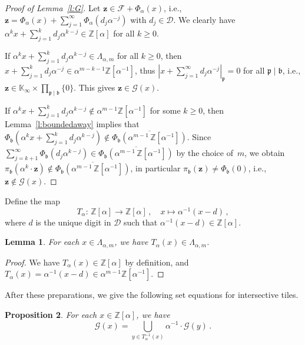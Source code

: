 \documentclass[12pt]{amsart}
\newtheorem{lemma}{Lemma}[section]
\newtheorem{proposition}[lemma]{Proposition}
\theoremstyle{definition}
\theoremstyle{remark}
\numberwithin{equation}{section}
\begin{document}
\begin{proof}[Proof of Lemma~\ref{l:G}]
Let $\mathbf{z} \in \mathcal{F} + \Phi_\alpha(x)$, i.e., $\mathbf{z} = \Phi_\alpha(x) + \sum_{j=1}^\infty \Phi_\alpha(d_j \alpha^{-j})$ with $d_j \in \mathcal{D}$.
We clearly have $\alpha^k x + \sum_{j=1}^k d_j \alpha^{k-j} \in \mathbb{Z}[\alpha]$ for all $k \ge 0$.

If $\alpha^k x + \sum_{j=1}^k d_j \alpha^{k-j} \in \Lambda_{\alpha,m}$ for all $k \ge 0$, then $x + \sum_{j=1}^k d_j \alpha^{-j} \in \alpha^{m-k-1} \mathbb{Z}[\alpha^{-1}]$, thus $|x + \sum_{j=1}^\infty d_j \alpha^{-j}|_\mathfrak{p} = 0$ for all $\mathfrak{p} \mid \mathfrak{b}$, i.e., $\mathbf{z} \in \mathbb{K}_\infty \times \prod_{\mathfrak{p}\mid \mathfrak{b}}\{0\}$.
This gives $\mathbf{z} \in \mathcal{G}(x)$.

If $\alpha^k x + \sum_{j=1}^k d_j \alpha^{k-j} \not\in \alpha^{m-1} \mathbb{Z}[\alpha^{-1}]$ for some $k \ge 0$, then Lemma~\ref{l:boundedaway} implies that $\Phi_\mathfrak{b}(\alpha^k x + \sum_{j=1}^k d_j \alpha^{k-j}) \not\in \overline{\Phi_\mathfrak{b}(\alpha^{m-1}\,\mathbb{Z}[\alpha^{-1}])}$.
Since $\sum_{j={k+1}}^\infty \Phi_\mathfrak{b}(d_j \alpha^{k-j}) \in \overline{\Phi_\mathfrak{b}(\alpha^{m-1}\,\mathbb{Z}[\alpha^{-1}])}$ by the choice of~$m$, we obtain $\pi_\mathfrak{b}(\alpha^k \cdot \mathbf{z}) \not\in \overline{\Phi_\mathfrak{b}(\alpha^{m-1}\,\mathbb{Z}[\alpha^{-1}])}$, in particular $\pi_\mathfrak{b}(\mathbf{z}) \neq \Phi_\mathfrak{b}(0)$, i.e., $\mathbf{z} \not\in \mathcal{G}(x)$.
\end{proof}

Define the map
\[
T_\alpha:\, \mathbb{Z}[\alpha] \to \mathbb{Z}[\alpha]\,, \quad x \mapsto \alpha^{-1} (x-d)\,,
\]
where $d$ is the unique digit in $\mathcal{D}$ such that $\alpha^{-1} (x-d) \in \mathbb{Z}[\alpha]$.

\begin{lemma} \label{l:betaxd}
For each $x \in \Lambda_{\alpha,m}$, we have $T_\alpha(x) \in \Lambda_{\alpha,m}$.
\end{lemma}

\begin{proof}
We have $T_\alpha(x) \in \mathbb{Z}[\alpha]$ by definition, and $T_\alpha(x) = \alpha^{-1} (x - d) \in \alpha^{m-1} \mathbb{Z}[\alpha^{-1}]$.
\end{proof}

After these preparations, we give the following set equations for intersective tiles.

\begin{proposition} \label{p:seteqG}
For each $x \in \mathbb{Z}[\alpha]$, we have
\[
\mathcal{G}(x) = \bigcup_{y \in T_\alpha^{-1}(x)} \alpha^{-1} \cdot \mathcal{G}(y)\,.
\]
\end{proposition}
\end{document}
